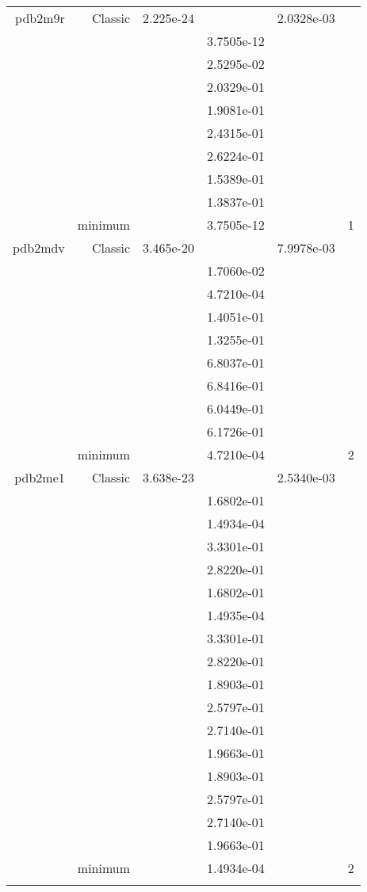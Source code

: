 \begin{xltabular}{\textwidth}{r|rS[table-format=1.3e+2]S[table-format=1.4e+2]S[table-format=1.4e+2]S[table-format=-1.5]}
pdb2m9r & Classic & 2.225e-24 &  & 2.0328e-03 & \\
&  &  & 3.7505e-12 & & \\
&  &  & 2.5295e-02 & & \\
&  &  & 2.0329e-01 & & \\
&  &  & 1.9081e-01 & & \\
&  &  & 2.4315e-01 & & \\
&  &  & 2.6224e-01 & & \\
&  &  & 1.5389e-01 & & \\
&  &  & 1.3837e-01 & & \\
& minimum &  & 3.7505e-12 & & 1 \\  \addlinespace
pdb2mdv & Classic & 3.465e-20 &  & 7.9978e-03 & \\
&  &  & 1.7060e-02 & & \\
&  &  & 4.7210e-04 & & \\
&  &  & 1.4051e-01 & & \\
&  &  & 1.3255e-01 & & \\
&  &  & 6.8037e-01 & & \\
&  &  & 6.8416e-01 & & \\
&  &  & 6.0449e-01 & & \\
&  &  & 6.1726e-01 & & \\
& minimum &  & 4.7210e-04 & & 2 \\  \addlinespace
pdb2me1 & Classic & 3.638e-23 &  & 2.5340e-03 & \\
&  &  & 1.6802e-01 & & \\
&  &  & 1.4934e-04 & & \\
&  &  & 3.3301e-01 & & \\
&  &  & 2.8220e-01 & & \\
&  &  & 1.6802e-01 & & \\
&  &  & 1.4935e-04 & & \\
&  &  & 3.3301e-01 & & \\
&  &  & 2.8220e-01 & & \\
&  &  & 1.8903e-01 & & \\
&  &  & 2.5797e-01 & & \\
&  &  & 2.7140e-01 & & \\
&  &  & 1.9663e-01 & & \\
&  &  & 1.8903e-01 & & \\
&  &  & 2.5797e-01 & & \\
&  &  & 2.7140e-01 & & \\
&  &  & 1.9663e-01 & & \\
& minimum &  & 1.4934e-04 & & 2 \\  \addlinespace

\end{xltabular}
